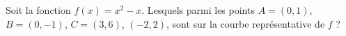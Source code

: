 
\begin{exercice}\label{exoSeconde-0049}

    Soit la fonction \( f(x)=x^2-x\). Lesquels parmi les points \( A=(0,1)\), \( B=(0,-1)\), \( C=(3,6)\), \( (-2,2)\), sont sur la courbe représentative de \( f\) ?

\end{exercice}
